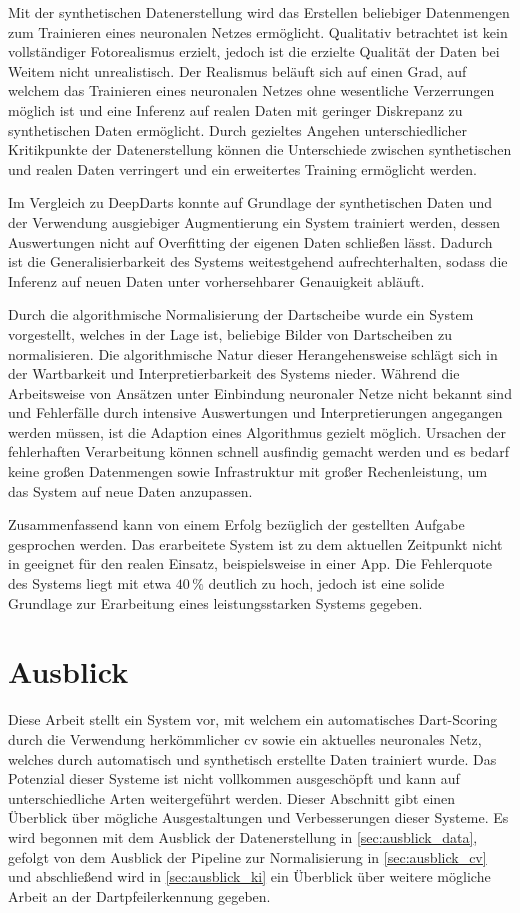 Mit der synthetischen Datenerstellung wird das Erstellen beliebiger Datenmengen zum Trainieren eines neuronalen Netzes ermöglicht. Qualitativ betrachtet ist kein vollständiger Fotorealismus erzielt, jedoch ist die erzielte Qualität der Daten bei Weitem nicht unrealistisch. Der Realismus beläuft sich auf einen Grad, auf welchem das Trainieren eines neuronalen Netzes ohne wesentliche Verzerrungen möglich ist und eine Inferenz auf realen Daten mit geringer Diskrepanz zu synthetischen Daten ermöglicht. Durch gezieltes Angehen unterschiedlicher Kritikpunkte der Datenerstellung können die Unterschiede zwischen synthetischen und realen Daten verringert und ein erweitertes Training ermöglicht werden.

Im Vergleich zu DeepDarts konnte auf Grundlage der synthetischen Daten und der Verwendung ausgiebiger Augmentierung ein System trainiert werden, dessen Auswertungen nicht auf Overfitting der eigenen Daten schließen lässt. Dadurch ist die Generalisierbarkeit des Systems weitestgehend aufrechterhalten, sodass die Inferenz auf neuen Daten unter vorhersehbarer Genauigkeit abläuft.

Durch die algorithmische Normalisierung der Dartscheibe wurde ein System vorgestellt, welches in der Lage ist, beliebige Bilder von Dartscheiben zu normalisieren. Die algorithmische Natur dieser Herangehensweise schlägt sich in der Wartbarkeit und Interpretierbarkeit des Systems nieder. Während die Arbeitsweise von Ansätzen unter Einbindung neuronaler Netze nicht bekannt sind und Fehlerfälle durch intensive Auswertungen und Interpretierungen angegangen werden müssen, ist die Adaption eines Algorithmus gezielt möglich. Ursachen der fehlerhaften Verarbeitung können schnell ausfindig gemacht werden und es bedarf keine großen Datenmengen sowie Infrastruktur mit großer Rechenleistung, um das System auf neue Daten anzupassen.

Zusammenfassend kann von einem Erfolg bezüglich der gestellten Aufgabe gesprochen werden. Das erarbeitete System ist zu dem aktuellen Zeitpunkt nicht in geeignet für den realen Einsatz, beispielsweise in einer App. Die Fehlerquote des Systems liegt mit etwa $40\,\%$ deutlich zu hoch, jedoch ist eine solide Grundlage zur Erarbeitung eines leistungsstarken Systems gegeben.

\section{Ausblick}
\label{sec:ausblick}

Diese Arbeit stellt ein System vor, mit welchem ein automatisches Dart-Scoring durch die Verwendung herkömmlicher \ac{cv} sowie ein aktuelles neuronales Netz, welches durch automatisch und synthetisch erstellte Daten trainiert wurde. Das Potenzial dieser Systeme ist nicht vollkommen ausgeschöpft und kann auf unterschiedliche Arten weitergeführt werden. Dieser Abschnitt gibt einen Überblick über mögliche Ausgestaltungen und Verbesserungen dieser Systeme. Es wird begonnen mit dem Ausblick der Datenerstellung in \autoref{sec:ausblick_data}, gefolgt von dem Ausblick der Pipeline zur Normalisierung in \autoref{sec:ausblick_cv} und abschließend wird in \autoref{sec:ausblick_ki} ein Überblick über weitere mögliche Arbeit an der Dartpfeilerkennung gegeben.

